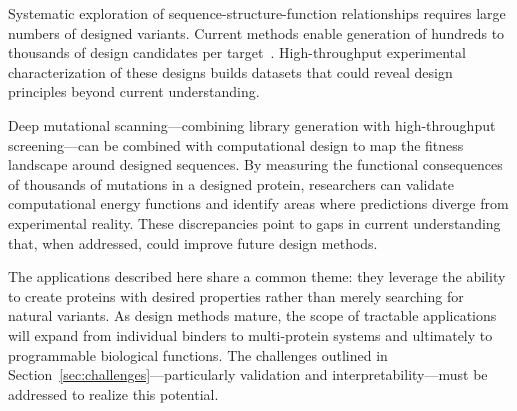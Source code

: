 Systematic exploration of sequence-structure-function relationships requires large numbers of designed variants. Current methods enable generation of hundreds to thousands of design candidates per target~\cite{watson2023rfdiffusion}. High-throughput experimental characterization of these designs builds datasets that could reveal design principles beyond current understanding.

Deep mutational scanning---combining library generation with high-throughput screening---can be combined with computational design to map the fitness landscape around designed sequences. By measuring the functional consequences of thousands of mutations in a designed protein, researchers can validate computational energy functions and identify areas where predictions diverge from experimental reality. These discrepancies point to gaps in current understanding that, when addressed, could improve future design methods.

\vspace{1em}
\noindent
The applications described here share a common theme: they leverage the ability to create proteins with desired properties rather than merely searching for natural variants. As design methods mature, the scope of tractable applications will expand from individual binders to multi-protein systems and ultimately to programmable biological functions. The challenges outlined in Section~\ref{sec:challenges}---particularly validation and interpretability---must be addressed to realize this potential.
